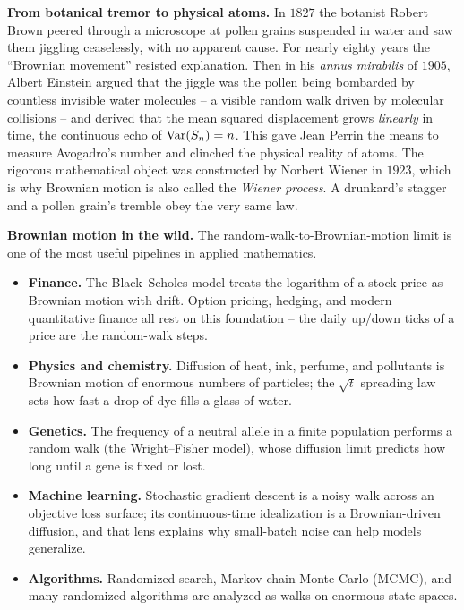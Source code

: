 \begin{connectionbox}
\textbf{From botanical tremor to physical atoms.} In $1827$ the botanist Robert
Brown peered through a microscope at pollen grains suspended in water and saw
them jiggling ceaselessly, with no apparent cause. For nearly eighty years the
``Brownian movement'' resisted explanation. Then in his \emph{annus mirabilis}
of $1905$, Albert Einstein argued that the jiggle was the pollen being
bombarded by countless invisible water molecules -- a visible random walk
driven by molecular collisions -- and derived that the mean squared displacement
grows \emph{linearly} in time, the continuous echo of $\operatorname{Var}(S_n) = n$. This gave
Jean Perrin the means to measure Avogadro's number and clinched the physical
reality of atoms. The rigorous mathematical object was constructed by Norbert
Wiener in $1923$, which is why Brownian motion is also called the \emph{Wiener
process}. A drunkard's stagger and a pollen grain's tremble obey the very same
law.
\end{connectionbox}

\begin{applicationbox}
\textbf{Brownian motion in the wild.} The random-walk-to-Brownian-motion limit
is one of the most useful pipelines in applied mathematics.
\begin{itemize}
\item \textbf{Finance.} The Black--Scholes model treats the logarithm of a
stock price as Brownian motion with drift. Option pricing, hedging, and modern
quantitative finance all rest on this foundation -- the daily up/down ticks of a
price are the random-walk steps.
\item \textbf{Physics and chemistry.} Diffusion of heat, ink, perfume, and
pollutants is Brownian motion of enormous numbers of particles; the
$\sqrt{t}$ spreading law sets how fast a drop of dye fills a glass of water.
\item \textbf{Genetics.} The frequency of a neutral allele in a finite
population performs a random walk (the Wright--Fisher model), whose
diffusion limit predicts how long until a gene is fixed or lost.
\item \textbf{Machine learning.} Stochastic gradient descent is a noisy walk
across an objective loss surface; its continuous-time idealization is a
Brownian-driven diffusion, and that lens explains why small-batch noise can
help models generalize.
\item \textbf{Algorithms.} Randomized search, Markov chain Monte Carlo (MCMC),
and many randomized algorithms are analyzed as walks on enormous state spaces.
\end{itemize}
\end{applicationbox}

